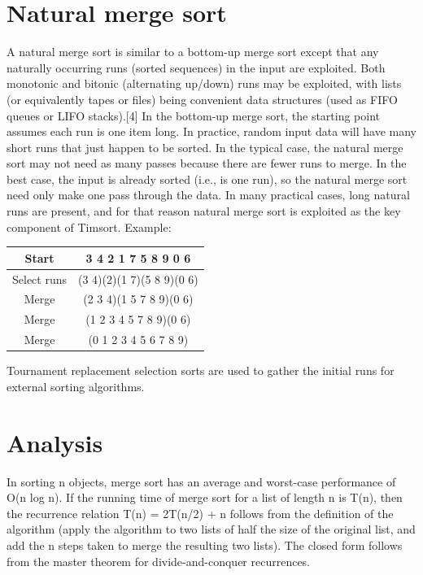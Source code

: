\documentclass{article}
\begin{document}
\section{Natural merge sort}
A natural merge sort is similar to a bottom-up merge sort except that any naturally occurring runs (sorted sequences) in the input are exploited. Both monotonic and bitonic (alternating up/down) runs may be exploited, with lists (or equivalently tapes or files) being convenient data structures (used as FIFO queues or LIFO stacks).[4] In the bottom-up merge sort, the starting point assumes each run is one item long. In practice, random input data will have many short runs that just happen to be sorted. In the typical case, the natural merge sort may not need as many passes because there are fewer runs to merge. In the best case, the input is already sorted (i.e., is one run), so the natural merge sort need only make one pass through the data. In many practical cases, long natural runs are present, and for that reason natural merge sort is exploited as the key component of Timsort. Example:
\begin{table}[h]
    \begin{center}
         \begin{tabular}{|c|c|}
            \hline
            Start & 3  4  2  1  7  5  8  9  0  6\\
            \hline
            Select runs & (3  4)(2)(1  7)(5  8  9)(0  6)\\
            \hline
            Merge & (2  3  4)(1  5  7  8  9)(0  6)\\
            \hline
            Merge & (1  2  3  4  5  7  8  9)(0  6)\\
            \hline
            Merge & (0  1  2  3  4  5  6  7  8  9)\\
            \hline
        \end{tabular}
    \end{center}
\end{table}

Tournament replacement selection sorts are used to gather the initial runs for external sorting algorithms.

\newpage
\section{Analysis}
In sorting n objects, merge sort has an average and worst-case performance of O(n log n). If the running time of merge sort for a list of length n is T(n), then the recurrence relation T(n) = 2T(n/2) + n follows from the definition of the algorithm (apply the algorithm to two lists of half the size of the original list, and add the n steps taken to merge the resulting two lists). The closed form follows from the master theorem for divide-and-conquer recurrences.
\end{document}
